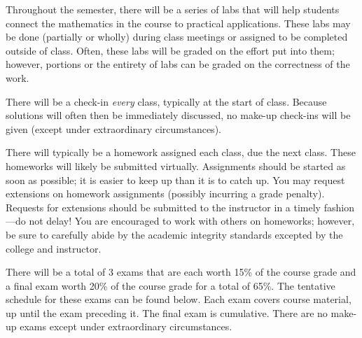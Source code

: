 \documentclass[11pt,letterpaper]{article}
\begin{document}
Throughout the semester, there will be a series of labs that will help students connect the mathematics in the course to practical applications. These labs may be done (partially or wholly) during class meetings or assigned to be completed outside of class. Often, these labs will be graded on the effort put into them; however, portions or the entirety of labs can be graded on the correctness of the work. \pspace

There will be a check-in \textit{every} class, typically at the start of class. Because solutions will often then be immediately discussed, no make-up check-ins will be given (except under extraordinary circumstances). \pspace


There will typically be a homework assigned each class, due the next class. These homeworks will likely be submitted virtually. Assignments should be started as soon as possible; it is easier to keep up than it is to catch up. You may request extensions on homework assignments (possibly incurring a grade penalty). Requests for extensions should be submitted to the instructor in a timely fashion---do not delay! You are encouraged to work with others on homeworks; however, be sure to carefully abide by the academic integrity standards excepted by the college and instructor. \pspace


There will be a total of 3 exams that are each worth 15\% of the course grade and a final exam worth 20\% of the course grade for a total of 65\%. The tentative schedule for these exams can be found below. Each exam covers course material, up until the exam preceding it. The final exam is cumulative. There are no make-up exams except under extraordinary circumstances. \pspace
\end{document}
